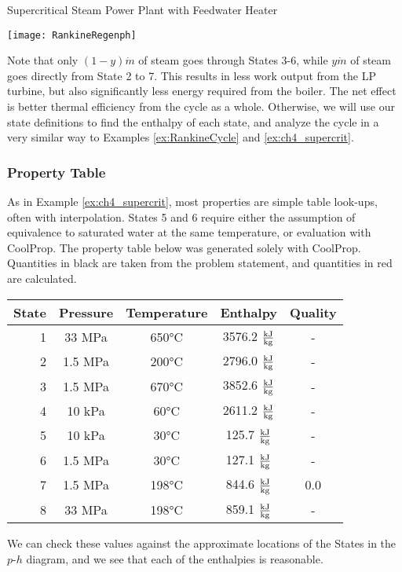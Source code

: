 \begin{example}[label=ex:ch4FeedwaterHeater]{Supercritical Steam Power Plant with Feedwater Heater}
  \begin{center}
    \texttt{[image: RankineRegenph]}
  \end{center}

  Note that only $(1-y)\dot{m}$ of steam goes through States 3-6, while $y\dot{m}$ of steam goes directly from State 2 to 7.  This results in less work output from the LP turbine, but also significantly less energy required from the boiler.  The net effect is better thermal efficiency from the cycle as a whole.  Otherwise, we will use our state definitions to find the enthalpy of each state, and analyze the cycle in a very similar way to Examples \ref{ex:RankineCycle} and \ref{ex:ch4_supercrit}.

  \subsubsection*{Property Table}
  As in Example \ref{ex:ch4_supercrit}, most properties are simple table look-ups, often with interpolation.  States 5 and 6 require either the assumption of equivalence to saturated water at the same temperature, or evaluation with CoolProp.  The property table below was generated solely with CoolProp.  Quantities in black are taken from the problem statement, and quantities in red are calculated.
  \begin{table}[H]
    \centering
    \def\arraystretch{1.5}
    \begin{tabular}{r|cccc}
      State & Pressure & Temperature & Enthalpy & Quality \\ \hline
      1 & 33 MPa & 650°C & {\color{Red} 3576.2 $\frac{\rm kJ}{\rm kg}$} & - \\
      2 & 1.5 MPa & 200°C & {\color{Red} 2796.0 $\frac{\rm kJ}{\rm kg}$} & - \\
      3 & 1.5 MPa & 670°C & {\color{Red} 3852.6 $\frac{\rm kJ}{\rm kg}$} & - \\
      4 & 10 kPa &  60°C & {\color{Red} 2611.2 $\frac{\rm kJ}{\rm kg}$} & - \\
      5 & 10 kPa &  30°C & {\color{Red} 125.7 $\frac{\rm kJ}{\rm kg}$} & - \\
      6 & 1.5 MPa & 30°C & {\color{Red} 127.1 $\frac{\rm kJ}{\rm kg}$} & - \\
      7 & 1.5 MPa & {\color{Red} 198°C} & {\color{Red} 844.6 $\frac{\rm kJ}{\rm kg}$} & 0.0 \\
      8 & 33 MPa & {\color{Red} 198°C} & {\color{Red} 859.1 $\frac{\rm kJ}{\rm kg}$} & - \\
    \end{tabular}
    \def\arraystretch{1.0}
  \end{table}
  We can check these values against the approximate locations of the States in the $p$-$h$ diagram, and we see that each of the enthalpies is reasonable.


\end{example}
